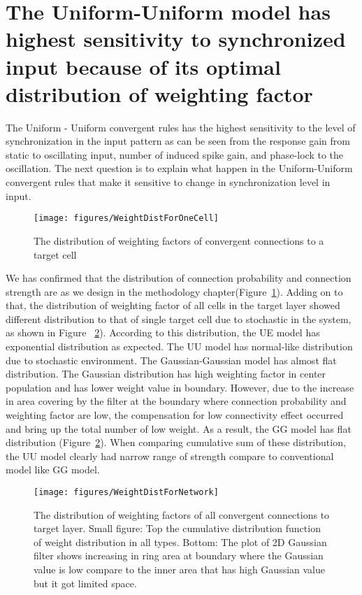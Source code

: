 \section{The Uniform-Uniform model has highest sensitivity to synchronized input because of its optimal distribution of weighting factor}
 The Uniform - Uniform convergent rules has the highest sensitivity to the level of synchronization in the input pattern as can be seen from the response gain from static to oscillating input, number of induced spike gain, and phase-lock to the oscillation.  The next question is to explain what happen in the Uniform-Uniform convergent rules  that make it sensitive to change in synchronization level in input.

\begin{figure}[!h]
	\centering
	\texttt{[image: figures/WeightDistForOneCell]}
	\caption{The distribution of weighting factors of convergent connections to a target cell} 
	\label{fig:WdistOne}
\end{figure}

 We has confirmed that the distribution of connection probability and connection strength are as we design in the methodology chapter(Figure~\ref{fig:WdistOne}). Adding on to that, the distribution of weighting factor of all cells in the target layer showed different distribution to that of single target cell due to stochastic in the system, as shown in Figure ~\ref{fig:WdistNN}). According to this distribution, the UE model has exponential distribution as expected. The UU model has normal-like distribution due to stochastic environment. The Gaussian-Gaussian model has almost flat distribution.  The Gaussian distribution has high weighting factor in center population and has lower weight value in boundary. However, due to the increase in area covering by the filter at the boundary where connection probability and weighting factor are low, the compensation for low connectivity effect occurred and bring up the  total number of low weight. As a result, the GG model has flat distribution (Figure~\ref{fig:WdistNN}).  When comparing cumulative sum of these distribution, the UU model clearly had narrow range of strength compare to conventional model like GG model.

\begin{figure}[!h]
	\centering
	\texttt{[image: figures/WeightDistForNetwork]}
	\caption{The distribution of weighting factors of all convergent connections to target layer. Small figure: Top the cumulative distribution function of weight distribution in all types. Bottom: The plot of 2D Gaussian filter shows increasing in ring area at boundary where the Gaussian value is low compare to the inner area that has high Gaussian value but it got limited space.} 
	\label{fig:WdistNN}
\end{figure}


